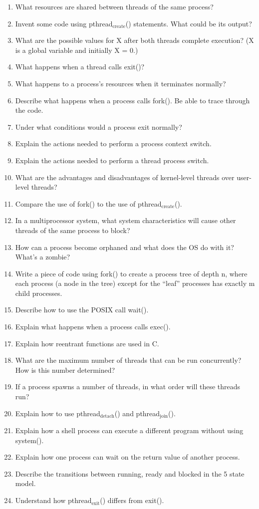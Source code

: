 \documentclass[11pt]{article}
\begin{document}
\begin{enumerate}
\item What resources are shared between threads of the same process?
\item Invent some code using pthread$_{\mathrm{create}}$() statements. What could be
      its output?
\item What are the possible values for X after both threads complete
      execution? (X is a global
      variable and initially X = 0.)
\item What happens when a thread calls exit()?
\item What happens to a process’s resources when it terminates normally?
\item Describe what happens when a process calls fork(). Be able to trace
      through the code.
\item Under what conditions would a process exit normally?
\item Explain the actions needed to perform a process context switch.
\item Explain the actions needed to perform a thread process switch.
\item What are the advantages and disadvantages of kernel-level threads
       over user-level threads?
\item Compare the use of fork() to the use of pthread$_{\mathrm{create}}$().
\item In a multiprocessor system, what system characteristics will cause
       other threads of the same
       process to block?
\item How can a process become orphaned and what does the OS do with it?
       What's a zombie?
\item Write a piece of code using fork() to create a process tree of
       depth n, where each process (a node in the tree) except for the
       ``leaf'' processes has exactly m child processes.
\item Describe how to use the POSIX call wait().
\item Explain what happens when a process calls exec().
\item Explain how reentrant functions are used in C.
\item What are the maximum number of threads that can be run
       concurrently? How is this number determined?
\item If a process spawns a number of threads, in what order will these
       threads run?
\item Explain how to use pthread$_{\mathrm{detach}}$() and pthread$_{\mathrm{join}}$().
\item Explain how a shell process can execute a different program
       without using system().
\item Explain how one process can wait on the return value of another
       process.
\item Describe the transitions between running, ready and blocked in the
       5 state model.
\item Understand how pthread$_{\mathrm{exit}}$() differs from exit().
\end{enumerate}
\end{document}
